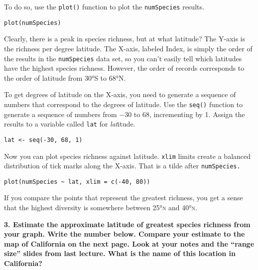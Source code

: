 \documentclass[11pt]{article}
\begin{document}
To do so, use the \texttt{plot()} function to plot the
\texttt{numSpecies} results.

\texttt{plot(numSpecies)}

Clearly, there is a peak in species richness, but at what latitude?
The Y-axis is the richness per degree latitude. The X-axis, labeled
Index, is simply the order of the results in the \texttt{numSpecies}
data set, so you can't easily tell which latitudes have the highest
species richness. However, the order of records corresponds to the order
of latitude from 30°S to 68°N.

To get degrees of latitude on the X-axis, you need to generate a
sequence of numbers that correspond to the degrees of latitude. Use the \texttt{seq()} function to generate a
sequence of numbers from $\minus$30 to 68, incrementing by 1. Assign the
results to a variable called \texttt{lat} for \emph{lat}itude.

\texttt{lat <- seq(-30, 68, 1)}

Now you can plot species richness against latitude. \texttt{xlim{}} limits create a balanced distribution of tick marks along the X-axis. That is a tilde after \texttt{numSpecies.}

\texttt{plot(numSpecies \textasciitilde{} lat, xlim = c(-40, 80))}

If you compare the points that represent the greatest richness, you
get a sense that the highest diversity is somewhere between 25°\textsc{n} and
40°\textsc{n}. %

\textbf{3. Estimate the approximate latitude of greatest species richness from your graph. Write the number below. Compare your estimate to the map of California on the next page. Look at your notes and the “range size” slides from last lecture. What is the name of this location in California?}

\vspace{3\baselineskip}
\end{document}
